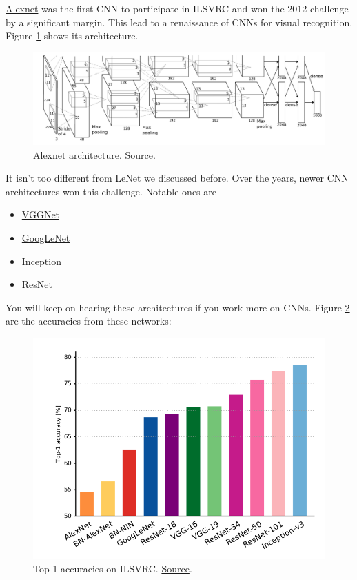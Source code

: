 \documentclass[a4paper]{tufte-handout}
\begin{document}
\href{https://papers.nips.cc/paper/4824-imagenet-classification-with-deep-convolutional-neural-networks.pdf}{Alexnet}
was the first CNN to participate in ILSVRC and won the 2012 challenge by
a significant margin. This lead to a renaissance of CNNs for visual
recognition. Figure \ref{fig:alexnet} shows its architecture.
\begin{figure}[!hbt]
\includegraphics[width=0.9\linewidth]{alexnet.png}
\caption{Alexnet architecture.
\href{http://mappingignorance.org/fx/media/2013/04/Deep-learning-5.png}{Source}.
}
\label{fig:alexnet}
\end{figure}


It isn't too different from LeNet we discussed before. Over the years,
newer CNN architectures won this challenge. Notable ones are

\begin{itemize}
\item
  \href{https://arxiv.org/pdf/1409.1556}{VGGNet}
\item
  \href{https://research.google.com/pubs/pub43022.html}{GoogLeNet}
\item
  Inception
\item
  \href{https://arxiv.org/abs/1512.03385}{ResNet}
\end{itemize}

You will keep on hearing these architectures if you work more on CNNs. Figure \ref{fig:top1}
are the accuracies from these networks:

\begin{figure}
  \includegraphics[width=\linewidth]{imagenet-top1.png}
  \caption{Top 1 accuracies on ILSVRC.
\href{https://chaosmail.github.io/deeplearning/2016/10/22/intro-to-deep-learning-for-computer-vision/\#Canziani16}{Source}.
}
\label{fig:top1}
\end{figure}
\end{document}

